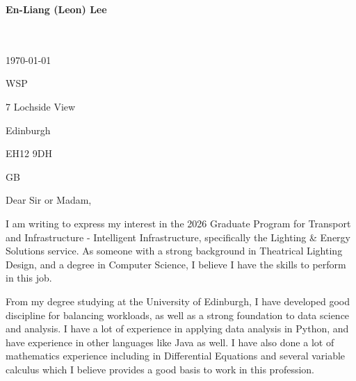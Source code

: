 \documentclass[10pt,english]{article}
\begin{document}
\setlength{\columnsep}{2.2em}
\setlength{\columnseprule}{4pt}



\newpage

\setlength{\columnsep}{2.2em}
\setlength{\columnseprule}{4pt}

\begin{minipage}[c][2.5cm][c]{1\mpwidth}
	\LARGE{\textbf{\textcolor{maincol}{En-Liang (Leon) Lee}}} \\[2pt]
	\normalsize{}\\
	\\
\end{minipage}

\bigskip


\begin{minipage}[c][2.5cm][c]{1\mpwidth}
	\today
	\bigskip

	WSP

	 7 Lochside View

	 Edinburgh

	 EH12 9DH

	 GB
\end{minipage}
\bigskip\bigskip

Dear Sir or Madam,
\medskip

I am writing to express my interest in the 2026 Graduate Program for Transport and Infrastructure - Intelligent Infrastructure, specifically the Lighting \& Energy Solutions service. As someone with a strong background in Theatrical Lighting Design, and a degree in Computer Science, I believe I have the skills to perform in this job.

\medskip

From my degree studying at the University of Edinburgh, I have developed good discipline for balancing workloads, as well as a strong foundation to data science and analysis. I have a lot of experience in applying data analysis in Python, and have experience in other languages like Java as well. I have also done a lot of mathematics experience including in Differential Equations and several variable calculus which I believe provides a good basis to work in this profession.
\end{document}
